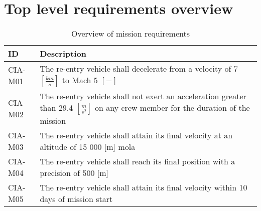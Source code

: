 \section{Top level requirements overview} \label{app:req}

\begin{table}[h]
	\caption{Overview of mission requirements} 
	\begin{tabular}{|p{}|p{}|}
    \hline
    ID          & Description                                                                                                      \\ \hline \hline
    CIA-M01& The re-entry vehicle shall decelerate from a velocity of 7 $[\frac{km}{s}]$ to Mach 5 $[-]$  \\ \hline
    CIA-M02 & The re-entry vehicle shall not exert an acceleration greater than 29.4 $[\frac{m}{s^2}]$ on any crew member for the duration of the mission			\\ \hline
    	CIA-M03 & The re-entry vehicle shall attain its final velocity at an altitude of 15 000 [m] \gls{mola} \\ \hline
    	CIA-M04 & The re-entry vehicle shall reach its final position with a precision of 500 [m]\\ \hline
    	CIA-M05 & The re-entry vehicle shall attain its final velocity within 10 days of mission start \\ \hline

    \end{tabular}
\end{table}

